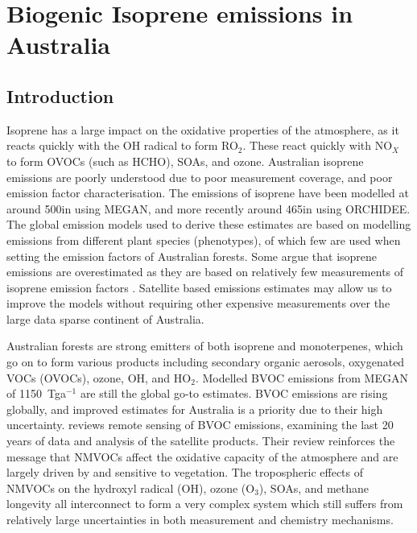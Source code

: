 
%
%



\chapter{Biogenic Isoprene emissions in Australia} %
\label{BioIsop}
  
\section{Introduction}  
\label{BioIsop:intro}  
  
  
  
  Isoprene has a large impact on the oxidative properties of the atmosphere, as it reacts quickly with the OH radical to form RO$_2$.
  These react quickly with NO$_X$ to form OVOCs (such as HCHO), SOAs, and ozone.
  Australian isoprene emissions are poorly understood due to poor measurement coverage, and poor emission factor characterisation.
  The emissions of isoprene have been modelled at around 500\tgcpyr in \textcite{Guenther1995,Guenther2006} using MEGAN, and more recently around 465\tgcpyr in \textcite{Messina2016} using ORCHIDEE.
  The global emission models used to derive these estimates are based on modelling emissions from different plant species (phenotypes), of which few are used when setting the emission factors of Australian forests.
  Some argue that isoprene emissions are overestimated as they are based on relatively few measurements of isoprene emission factors \parencite{Winters2009, FortemsCheiney2012,}.
  Satellite based emissions estimates may allow us to improve the models without requiring other expensive measurements over the large data sparse continent of Australia.
  
  Australian forests are strong emitters of both isoprene and monoterpenes, which go on to form various products including secondary organic aerosols, oxygenated VOCs (OVOCs), ozone, OH, and HO$_2$.
  Modelled BVOC emissions from MEGAN \parencite{Guenther2000} of 1150~Tga$^{-1}$ are still the global go-to estimates.
  BVOC emissions are rising globally, and improved estimates for Australia is a priority due to their high uncertainty.
  \textcite{Kefauver2014} reviews remote sensing of BVOC emissions, examining the last 20 years of data and analysis of the satellite products.
  Their review reinforces the message that NMVOCs affect the oxidative capacity of the atmosphere and are largely driven by and sensitive to vegetation.
  The tropospheric effects of NMVOCs on the hydroxyl radical (OH), ozone (O$_3$), SOAs, and methane longevity all interconnect to form a very complex system which still suffers from relatively large uncertainties in both measurement and chemistry mechanisms.
  

